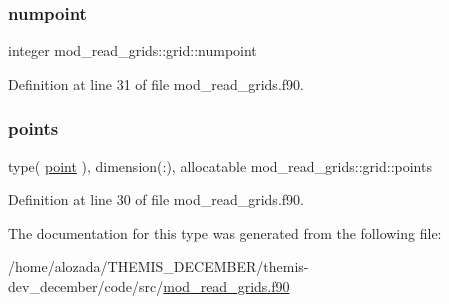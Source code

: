 \subsubsection{\texorpdfstring{numpoint}{numpoint}}
{\footnotesize\ttfamily integer mod\+\_\+read\+\_\+grids\+::grid\+::numpoint}



Definition at line 31 of file mod\+\_\+read\+\_\+grids.\+f90.

\mbox{\label{structmod__read__grids_1_1grid_aa276c61a9bfda811d98102170e4bfeaf}} 
\subsubsection{\texorpdfstring{points}{points}}
{\footnotesize\ttfamily type( \hyperlink{structmod__read__grids_1_1point}{point} ), dimension(\+:), allocatable mod\+\_\+read\+\_\+grids\+::grid\+::points}



Definition at line 30 of file mod\+\_\+read\+\_\+grids.\+f90.



The documentation for this type was generated from the following file\+:\begin{DoxyCompactItemize}
\item 
/home/alozada/\+T\+H\+E\+M\+I\+S\+\_\+\+D\+E\+C\+E\+M\+B\+E\+R/themis-\/dev\+\_\+december/code/src/\hyperlink{mod__read__grids_8f90}{mod\+\_\+read\+\_\+grids.\+f90}\end{DoxyCompactItemize}
